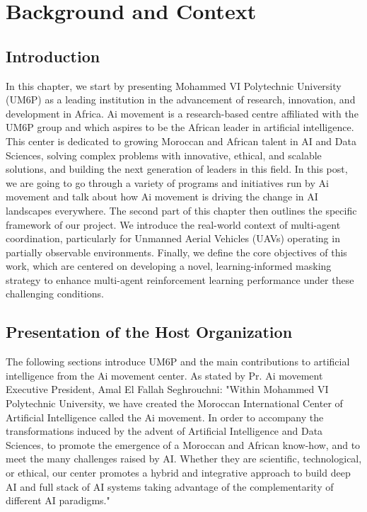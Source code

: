 
\chapter{Background and Context}


\section*{Introduction}

In this chapter, we start by presenting Mohammed VI Polytechnic University (UM6P) as a leading institution in the advancement of research, innovation, and development in Africa. Ai movement is a research-based centre affiliated with the UM6P group and which aspires to be the African leader in artificial intelligence. This center is dedicated to growing Moroccan and African talent in AI and Data Sciences, solving complex problems with innovative, ethical, and scalable solutions, and building the next generation of leaders in this field. In this post, we are going to go through a variety of programs and initiatives run by Ai movement and talk about how Ai movement is driving the change in AI landscapes everywhere.
The second part of this chapter then outlines the specific framework of our project. We introduce the real-world context of multi-agent coordination, particularly for Unmanned Aerial Vehicles (UAVs) operating in partially observable environments. Finally, we define the core objectives of this work, which are centered on developing a novel, learning-informed masking strategy to enhance multi-agent reinforcement learning performance under these challenging conditions.

\section{Presentation of the Host Organization}

The following sections introduce UM6P and the main contributions to artificial intelligence from the Ai movement center. As stated by Pr. Ai movement Executive President, Amal El Fallah Seghrouchni: "Within Mohammed VI Polytechnic University, we have created the Moroccan International Center of Artificial Intelligence called the Ai movement. In order to accompany the transformations induced by the advent of Artificial Intelligence and Data Sciences, to promote the emergence of a Moroccan and African know-how, and to meet the many challenges raised by AI. Whether they are scientific, technological, or ethical, our center promotes a hybrid and integrative approach to build deep AI and full stack of AI systems taking advantage of the complementarity of different AI paradigms." 


